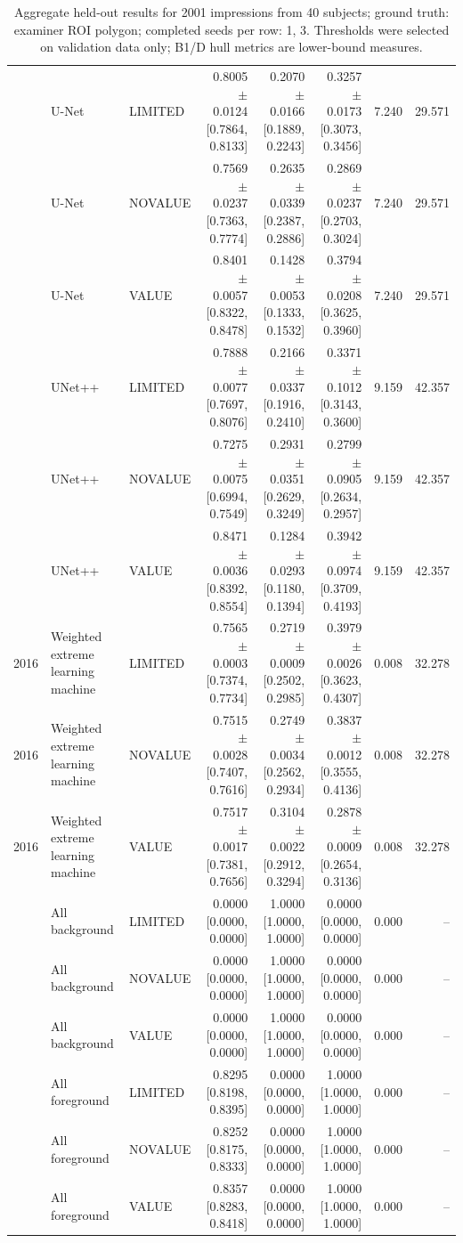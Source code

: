 \begin{table}[t]
\begin{tabular}{lllrrrrr}
 & U-Net & LIMITED & 0.8005 $\pm$ 0.0124 [0.7864, 0.8133] & 0.2070 $\pm$ 0.0166 [0.1889, 0.2243] & 0.3257 $\pm$ 0.0173 [0.3073, 0.3456] & 7.240 & 29.571 \\
 & U-Net & NOVALUE & 0.7569 $\pm$ 0.0237 [0.7363, 0.7774] & 0.2635 $\pm$ 0.0339 [0.2387, 0.2886] & 0.2869 $\pm$ 0.0237 [0.2703, 0.3024] & 7.240 & 29.571 \\
 & U-Net & VALUE & 0.8401 $\pm$ 0.0057 [0.8322, 0.8478] & 0.1428 $\pm$ 0.0053 [0.1333, 0.1532] & 0.3794 $\pm$ 0.0208 [0.3625, 0.3960] & 7.240 & 29.571 \\
 & UNet++ & LIMITED & 0.7888 $\pm$ 0.0077 [0.7697, 0.8076] & 0.2166 $\pm$ 0.0337 [0.1916, 0.2410] & 0.3371 $\pm$ 0.1012 [0.3143, 0.3600] & 9.159 & 42.357 \\
 & UNet++ & NOVALUE & 0.7275 $\pm$ 0.0075 [0.6994, 0.7549] & 0.2931 $\pm$ 0.0351 [0.2629, 0.3249] & 0.2799 $\pm$ 0.0905 [0.2634, 0.2957] & 9.159 & 42.357 \\
 & UNet++ & VALUE & 0.8471 $\pm$ 0.0036 [0.8392, 0.8554] & 0.1284 $\pm$ 0.0293 [0.1180, 0.1394] & 0.3942 $\pm$ 0.0974 [0.3709, 0.4193] & 9.159 & 42.357 \\
2016 & Weighted extreme learning machine & LIMITED & 0.7565 $\pm$ 0.0003 [0.7374, 0.7734] & 0.2719 $\pm$ 0.0009 [0.2502, 0.2985] & 0.3979 $\pm$ 0.0026 [0.3623, 0.4307] & 0.008 & 32.278 \\
2016 & Weighted extreme learning machine & NOVALUE & 0.7515 $\pm$ 0.0028 [0.7407, 0.7616] & 0.2749 $\pm$ 0.0034 [0.2562, 0.2934] & 0.3837 $\pm$ 0.0012 [0.3555, 0.4136] & 0.008 & 32.278 \\
2016 & Weighted extreme learning machine & VALUE & 0.7517 $\pm$ 0.0017 [0.7381, 0.7656] & 0.3104 $\pm$ 0.0022 [0.2912, 0.3294] & 0.2878 $\pm$ 0.0009 [0.2654, 0.3136] & 0.008 & 32.278 \\
 & All background & LIMITED & 0.0000 [0.0000, 0.0000] & 1.0000 [1.0000, 1.0000] & 0.0000 [0.0000, 0.0000] & 0.000 & -- \\
 & All background & NOVALUE & 0.0000 [0.0000, 0.0000] & 1.0000 [1.0000, 1.0000] & 0.0000 [0.0000, 0.0000] & 0.000 & -- \\
 & All background & VALUE & 0.0000 [0.0000, 0.0000] & 1.0000 [1.0000, 1.0000] & 0.0000 [0.0000, 0.0000] & 0.000 & -- \\
 & All foreground & LIMITED & 0.8295 [0.8198, 0.8395] & 0.0000 [0.0000, 0.0000] & 1.0000 [1.0000, 1.0000] & 0.000 & -- \\
 & All foreground & NOVALUE & 0.8252 [0.8175, 0.8333] & 0.0000 [0.0000, 0.0000] & 1.0000 [1.0000, 1.0000] & 0.000 & -- \\
 & All foreground & VALUE & 0.8357 [0.8283, 0.8418] & 0.0000 [0.0000, 0.0000] & 1.0000 [1.0000, 1.0000] & 0.000 & -- \\
\bottomrule
\end{tabular}
\caption{Aggregate held-out results for 2001 impressions from 40 subjects; ground truth: examiner ROI polygon; completed seeds per row: 1, 3. Thresholds were selected on validation data only; B1/D hull metrics are lower-bound measures.}
\end{table}
